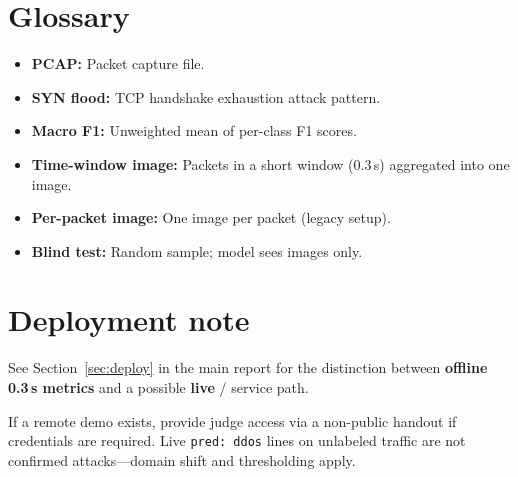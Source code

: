\section{Glossary}
\label{app:gloss}

\begin{itemize}[leftmargin=*]
  \item \textbf{PCAP:} Packet capture file.
  \item \textbf{SYN flood:} TCP handshake exhaustion attack pattern.
  \item \textbf{Macro F1:} Unweighted mean of per-class F1 scores.
  \item \textbf{Time-window image:} Packets in a short window (0.3\,s) aggregated into one image.
  \item \textbf{Per-packet image:} One image per packet (legacy setup).
  \item \textbf{Blind test:} Random sample; model sees images only.
\end{itemize}

\section{Deployment note}
\label{app:deploy}

See Section~\ref{sec:deploy} in the main report for the distinction between \textbf{offline 0.3\,s metrics} and a possible \textbf{live}  / service path.

If a remote demo exists, provide judge access via a non-public handout if credentials are required. Live \texttt{pred: ddos} lines on unlabeled traffic are not confirmed attacks---domain shift and thresholding apply.

